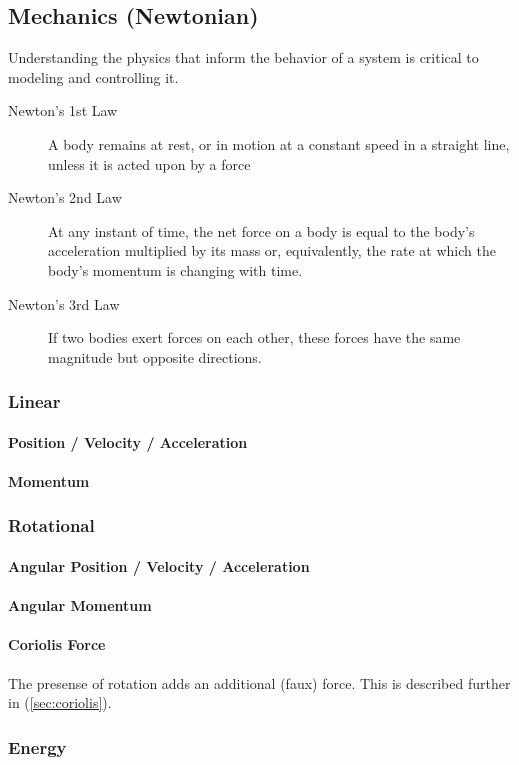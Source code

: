 \documentclass[../notes.tex]{subfiles}
\begin{document}
\subsection{Mechanics (Newtonian)}
Understanding the physics that inform the behavior of a system is critical to modeling and controlling it.
\begin{description}
    \item[Newton's 1st Law] A body remains at rest, or in motion at a constant speed in a straight line, unless it is acted upon by a force
    \item[Newton's 2nd Law] At any instant of time, the net force on a body is equal to the body's acceleration multiplied by its mass or, equivalently, the rate at which the body's momentum is changing with time.
    \item[Newton's 3rd Law] If two bodies exert forces on each other, these forces have the same magnitude but opposite directions.
\end{description}
\subsubsection{Linear}
\paragraph{Position / Velocity / Acceleration}
\paragraph{Momentum}
\subsubsection{Rotational}
\paragraph{Angular Position / Velocity / Acceleration}
\paragraph{Angular Momentum}
\paragraph{Coriolis Force}
The presense of rotation adds an additional (faux) force. This is described further in (\underline{\ref{sec:coriolis}}).
\subsubsection{Energy}
\end{document}
